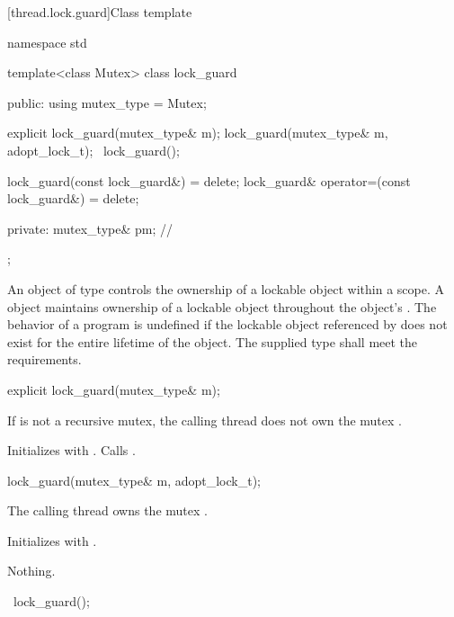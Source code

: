 [thread.lock.guard]{Class template }

%
\begin{codeblock}
namespace std {
  template<class Mutex>
  class lock_guard {
  public:
    using mutex_type = Mutex;

    explicit lock_guard(mutex_type& m);
    lock_guard(mutex_type& m, adopt_lock_t);
    ~lock_guard();

    lock_guard(const lock_guard&) = delete;
    lock_guard& operator=(const lock_guard&) = delete;

  private:
    mutex_type& pm;             // \expos
  };
}
\end{codeblock}

\pnum
An object of type  controls the ownership of a lockable object
within a scope. A  object maintains ownership of a lockable
object throughout the  object's .
The behavior of a program is undefined if the lockable object referenced by
 does not exist for the entire lifetime of the 
object. The supplied  type shall meet the 
requirements.

%
\begin{itemdecl}
explicit lock_guard(mutex_type& m);
\end{itemdecl}

\begin{itemdescr}
\pnum
\expects
If  is not a recursive mutex,
the calling thread does not own the mutex .

\pnum
\effects
Initializes  with . Calls .
\end{itemdescr}

%
\begin{itemdecl}
lock_guard(mutex_type& m, adopt_lock_t);
\end{itemdecl}

\begin{itemdescr}
\pnum
\expects
The calling thread owns the mutex .

\pnum
\effects
Initializes  with .

\pnum
\throws
Nothing.
\end{itemdescr}

%
\begin{itemdecl}
~lock_guard();
\end{itemdecl}

